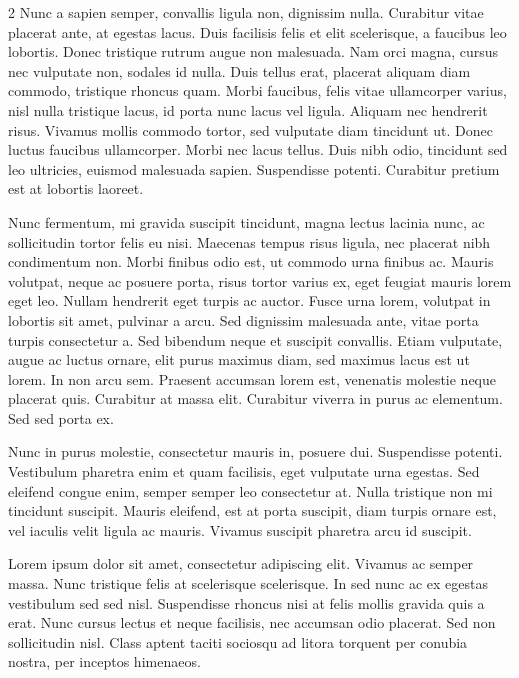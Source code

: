 \documentclass[9pt,]{book}
\begin{document}
\begin {multicols}{2}
Nunc a sapien semper, convallis ligula non, dignissim nulla. Curabitur
vitae placerat ante, at egestas lacus. Duis facilisis felis et elit
scelerisque, a faucibus leo lobortis. Donec tristique rutrum augue non
malesuada. Nam orci magna, cursus nec vulputate non, sodales id nulla.
Duis tellus erat, placerat aliquam diam commodo, tristique rhoncus quam.
Morbi faucibus, felis vitae ullamcorper varius, nisl nulla tristique
lacus, id porta nunc lacus vel ligula. Aliquam nec hendrerit risus.
Vivamus mollis commodo tortor, sed vulputate diam tincidunt ut. Donec
luctus faucibus ullamcorper. Morbi nec lacus tellus. Duis nibh odio,
tincidunt sed leo ultricies, euismod malesuada sapien. Suspendisse
potenti. Curabitur pretium est at lobortis laoreet.

Nunc fermentum, mi gravida suscipit tincidunt, magna lectus lacinia
nunc, ac sollicitudin tortor felis eu nisi. Maecenas tempus risus
ligula, nec placerat nibh condimentum non. Morbi finibus odio est, ut
commodo urna finibus ac. Mauris volutpat, neque ac posuere porta, risus
tortor varius ex, eget feugiat mauris lorem eget leo. Nullam hendrerit
eget turpis ac auctor. Fusce urna lorem, volutpat in lobortis sit amet,
pulvinar a arcu. Sed dignissim malesuada ante, vitae porta turpis
consectetur a. Sed bibendum neque et suscipit convallis. Etiam
vulputate, augue ac luctus ornare, elit purus maximus diam, sed maximus
lacus est ut lorem. In non arcu sem. Praesent accumsan lorem est,
venenatis molestie neque placerat quis. Curabitur at massa elit.
Curabitur viverra in purus ac elementum. Sed sed porta ex.

Nunc in purus molestie, consectetur mauris in, posuere dui. Suspendisse
potenti. Vestibulum pharetra enim et quam facilisis, eget vulputate urna
egestas. Sed eleifend congue enim, semper semper leo consectetur at.
Nulla tristique non mi tincidunt suscipit. Mauris eleifend, est at porta
suscipit, diam turpis ornare est, vel iaculis velit ligula ac mauris.
Vivamus suscipit pharetra arcu id suscipit.

Lorem ipsum dolor sit amet, consectetur adipiscing elit. Vivamus ac
semper massa. Nunc tristique felis at scelerisque scelerisque. In sed
nunc ac ex egestas vestibulum sed sed nisl. Suspendisse rhoncus nisi at
felis mollis gravida quis a erat. Nunc cursus lectus et neque facilisis,
nec accumsan odio placerat. Sed non sollicitudin nisl. Class aptent
taciti sociosqu ad litora torquent per conubia nostra, per inceptos
himenaeos.


\end{multicols}
\end{document}
